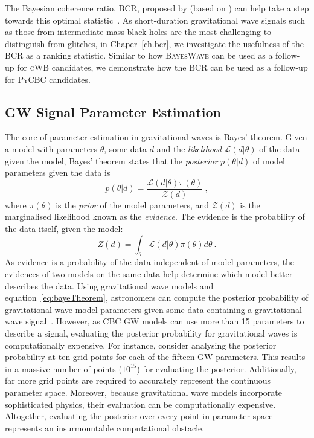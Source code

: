 The Bayesian coherence ratio, \textsc{BCR}, proposed by \citet{bcr_paper} (based on \citet{bci}) can help take a step towards this optimal statistic~\cite{bci, bayeswave_as_followup, bcr_paper, bootstrap_gw, bcr_gw151216,bcr_gw151216, bayesian_odds}. 
As short-duration gravitational wave signals such as those from intermediate-mass black holes are the most challenging to distinguish from glitches, in Chaper~\ref{ch.bcr}, we investigate the usefulness of the \textsc{BCR} as a ranking statistic. 
Similar to how \textsc{BayesWave} can be used as a follow-up for \textsc{cWB} candidates, we demonstrate how the \textsc{BCR} can be used as a follow-up for \textsc{PyCBC} candidates. 

\subsection{GW Signal Parameter Estimation}

The core of parameter estimation in gravitational waves is Bayes' theorem. 
Given a model with parameters $\theta$, some data $d$ and the \textit{likelihood} $\mathcal{L}(d|\theta)$ of the data given the model, Bayes' theorem states that the \textit{posterior} $p(\theta|d)$ of model parameters given the data is 
\begin{equation}
{p(\theta|d)} = \frac{\mathcal{L}(d|\theta)\pi(\theta)}{\mathcal{Z}(d)}\ , \label{eq:bayeTheorem}
\end{equation}
where $\pi(\theta)$ is the \textit{prior} of the model parameters, and $\mathcal{Z}(d)$ is the marginalised likelihood known as the
\textit{evidence}. 
The evidence is the probability of the data itself, given the model:
\begin{equation}
Z(d) = \int_\theta \mathcal{L}(d|\theta)\pi(\theta)d\theta\ .
\label{eq:evid}
\end{equation}
As evidence is a probability of the data independent of model parameters, the evidences of two models on the same data help determine which model better describes the data.
Using gravitational wave models and equation~\ref{eq:bayeTheorem}, astronomers can compute the posterior probability of gravitational wave model parameters given some data containing a gravitational wave signal~\cite{abbott2018prospects}.
However, as CBC GW models can use more than 15 parameters to describe a signal, evaluating the posterior probability for gravitational waves is computationally expensive. 
For instance, consider analysing the posterior probability at ten grid points for each of the fifteen GW parameters.
This results in a massive number of points ($10^{15}$) for evaluating the posterior.
Additionally, far more grid points are required to accurately represent the continuous parameter space.
Moreover, because gravitational wave models incorporate sophisticated physics, their evaluation can be computationally expensive.
Altogether, evaluating the posterior over every point in parameter space represents an insurmountable computational obstacle.

